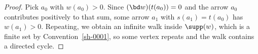 \begin{proof}
Pick $a_{0}$ with $w(a_{0}) > 0$. Since $(\bd w)(t(a_{0})) = 0$ and the arrow $a_{0}$ contributes positively to that sum, some arrow $a_{1}$ with $s(a_{1}) = t(a_{0})$ has $w(a_{1}) > 0$. Repeating, we obtain an infinite walk inside $\supp(w)$, which is a finite set by Convention~\ref{sh-0001}, so some vertex repeats and the walk contains a directed cycle.
\end{proof}
